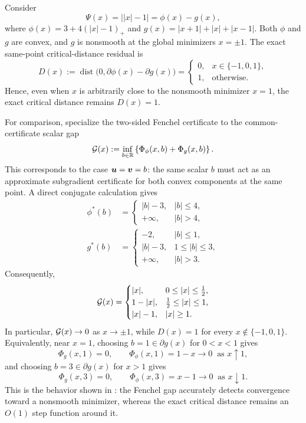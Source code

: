 \begin{example}
\label{ex:motivating-dc-gap}
Consider
\[
    \Psi(x)=\bigl||x|-1\bigr|
    =
    \phi(x)-g(x),
\]
where \( \phi(x)=3+4(|x|-1)_+ \) and \( g(x)=|x+1|+|x|+|x-1| \). Both \(\phi\) and \(g\) are convex, and \(g\) is nonsmooth at the global minimizers \(x=\pm1\). The exact same-point critical-distance residual is
\[
    D(x)
    :=
    \operatorname{dist}\bigl(0,\partial\phi(x)-\partial g(x)\bigr)
    =
    \begin{cases}
    0, & x\in\{-1,0,1\},\\
    1, & \text{otherwise}.
    \end{cases}
\]
Hence, even when \(x\) is arbitrarily close to the nonsmooth minimizer \(x=1\), the exact critical distance remains \(D(x)=1\).

For comparison, specialize the two-sided Fenchel certificate to the common-certificate scalar gap
\[
    \mathcal{G}(x)
    :=
    \inf\limits_{b\in\mathbb{R}}
    \left\{
        \Phi_\phi(x,b)+\Phi_g(x,b)
    \right\}.
\]
This corresponds to the case \(\bm{u}=\bm{v}=b\): the same scalar \(b\) must act as an approximate subgradient certificate for both convex components at the same point. A direct conjugate calculation gives
\[
\begin{aligned}
    \phi^*(b)
    &=
    \begin{cases}
        |b|-3, & |b|\le 4,\\
        +\infty, & |b|>4,
    \end{cases}
    \\
    g^*(b)
    &=
    \begin{cases}
        -2, & |b|\le 1,\\
        |b|-3, & 1\le |b|\le 3,\\
        +\infty, & |b|>3.
    \end{cases}
\end{aligned}
\]
Consequently,
\[
    \mathcal{G}(x)
    =
    \begin{cases}
        |x|, & 0\le |x|\le \frac12,\\
        1-|x|, & \frac12\le |x|\le 1,\\
        |x|-1, & |x|\ge 1.
    \end{cases}
\]
In particular, \(\mathcal{G}(x)\to0\) as \(x\to\pm1\), while \(D(x)=1\) for every \(x\notin\{-1,0,1\}\). Equivalently, near \(x=1\), choosing \(b=1\in\partial g(x)\) for \(0<x<1\) gives
\[
    \Phi_g(x,1)=0,
    \qquad
    \Phi_\phi(x,1)=1-x\to0
    \;\;\text{as }x\uparrow1,
\]
and choosing \(b=3\in\partial g(x)\) for \(x>1\) gives
\[
    \Phi_g(x,3)=0,
    \qquad
    \Phi_\phi(x,3)=x-1\to0
    \;\;\text{as }x\downarrow1.
\]
This is the behavior shown in : the Fenchel gap accurately detects convergence toward a nonsmooth minimizer, whereas the exact critical distance remains an \(O(1)\) step function around it.
\end{example}

